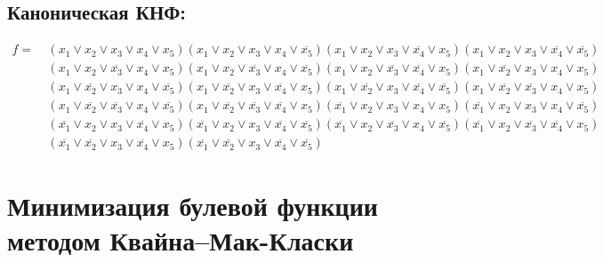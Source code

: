 \documentclass{article}
\begin{document}
\subsection*{Каноническая КНФ:}
\begin{align*}
f =\: &\left(x_{1} \lor x_{2} \lor x_{3} \lor x_{4} \lor x_{5}\right)\left(x_{1} \lor x_{2} \lor x_{3} \lor x_{4} \lor \overline{x_{5}}\right)\left(x_{1} \lor x_{2} \lor x_{3} \lor \overline{x_{4}} \lor x_{5}\right)\left(x_{1} \lor x_{2} \lor x_{3} \lor \overline{x_{4}} \lor \overline{x_{5}}\right)\\&\left(x_{1} \lor x_{2} \lor \overline{x_{3}} \lor x_{4} \lor x_{5}\right)\left(x_{1} \lor x_{2} \lor \overline{x_{3}} \lor x_{4} \lor \overline{x_{5}}\right)\left(x_{1} \lor x_{2} \lor \overline{x_{3}} \lor \overline{x_{4}} \lor x_{5}\right)\left(x_{1} \lor \overline{x_{2}} \lor x_{3} \lor x_{4} \lor x_{5}\right)\\&\left(x_{1} \lor \overline{x_{2}} \lor x_{3} \lor x_{4} \lor \overline{x_{5}}\right)\left(x_{1} \lor \overline{x_{2}} \lor x_{3} \lor \overline{x_{4}} \lor x_{5}\right)\left(x_{1} \lor \overline{x_{2}} \lor x_{3} \lor \overline{x_{4}} \lor \overline{x_{5}}\right)\left(x_{1} \lor \overline{x_{2}} \lor \overline{x_{3}} \lor x_{4} \lor x_{5}\right)\\&\left(x_{1} \lor \overline{x_{2}} \lor \overline{x_{3}} \lor x_{4} \lor \overline{x_{5}}\right)\left(x_{1} \lor \overline{x_{2}} \lor \overline{x_{3}} \lor \overline{x_{4}} \lor x_{5}\right)\left(\overline{x_{1}} \lor x_{2} \lor x_{3} \lor x_{4} \lor x_{5}\right)\left(\overline{x_{1}} \lor x_{2} \lor x_{3} \lor x_{4} \lor \overline{x_{5}}\right)\\&\left(\overline{x_{1}} \lor x_{2} \lor x_{3} \lor \overline{x_{4}} \lor x_{5}\right)\left(\overline{x_{1}} \lor x_{2} \lor x_{3} \lor \overline{x_{4}} \lor \overline{x_{5}}\right)\left(\overline{x_{1}} \lor x_{2} \lor \overline{x_{3}} \lor x_{4} \lor \overline{x_{5}}\right)\left(\overline{x_{1}} \lor x_{2} \lor \overline{x_{3}} \lor \overline{x_{4}} \lor x_{5}\right)\\&\left(\overline{x_{1}} \lor \overline{x_{2}} \lor x_{3} \lor \overline{x_{4}} \lor x_{5}\right)\left(\overline{x_{1}} \lor \overline{x_{2}} \lor x_{3} \lor \overline{x_{4}} \lor \overline{x_{5}}\right)\end{align*}
\section*{Минимизация булевой функции методом Квайна--Мак-Класки}
\end{document}
